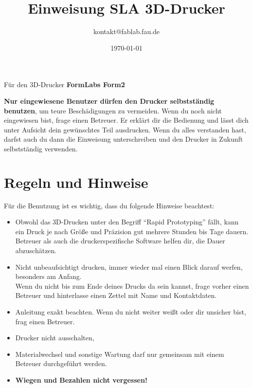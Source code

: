 \documentclass{\basedir/fablab-document}
\date{\today}
\author{kontakt@fablab.fau.de}
\title{Einweisung SLA 3D-Drucker}
\begin{document}
	
	\maketitle
	\begin{center}
		Für den 3D-Drucker \textbf{FormLabs Form2}
	\end{center}
	
	\textbf{Nur eingewiesene Benutzer dürfen den Drucker selbstständig benutzen}, um teure Beschädigungen zu vermeiden. Wenn du noch nicht eingewiesen bist, frage einen Betreuer. Er erklärt dir die Bedienung und lässt dich unter Aufsicht dein gewünschtes Teil ausdrucken. Wenn du alles verstanden hast, darfst auch du dann die Einweisung unterschreiben und den Drucker in Zukunft selbstständig verwenden.
	
	\section{Regeln und Hinweise}
	Für die Benutzung ist es wichtig, dass du folgende Hinweise beachtest:
	
	\begin{itemize}
		\item Obwohl das 3D-Drucken unter den Begriff ``Rapid Prototyping'' fällt, kann ein Druck je nach Größe und
		Präzision gut mehrere Stunden bis Tage dauern. Betreuer als auch die druckerspezifische Software helfen dir, die Dauer abzuschätzen.
		\item Nicht unbeaufsichtigt drucken, immer wieder mal einen Blick darauf werfen, besonders am Anfang.\\
		Wenn du nicht bis zum Ende deines Drucks da sein kannst, frage vorher einen Betreuer und hinterlasse einen Zettel mit Name und Kontaktdaten.
		\item Anleitung exakt beachten. Wenn du nicht weiter weißt oder dir unsicher bist, frag einen Betreuer.
		\item Drucker nicht ausschalten,
		\item Materialwechsel und sonstige Wartung darf nur gemeinsam mit einem Betreuer durchgeführt werden.
		\item \textbf{Wiegen und Bezahlen nicht vergessen!}
	\end{itemize}
\end{document}
